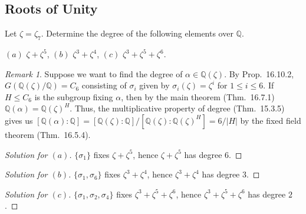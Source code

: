 \documentclass[12pt]{article}
\theoremstyle{remark}
\newtheorem*{remark}{Remark}
\begin{document}
\subsection{Roots of Unity}
\setcounter{subsubsection}{2}
\begin{problem}
  Let $\zeta = \zeta_7$. Determine the degree of the following elements over $\mathbb{Q}$.
  \par \noindent $(a)$ $\zeta + \zeta^5$, $(b)$ $\zeta^3 + \zeta^4$, $(c)$ $\zeta^3 + \zeta^5 + \zeta^6$.
\end{problem}
\begin{remark}
  Suppose we want to find the degree of $\alpha \in \mathbb{Q}(\zeta)$. By Prop.~16.10.2, $G(\mathbb{Q}(\zeta)/\mathbb{Q}) = C_6$ consisting of $\sigma_i$ given by $\sigma_i(\zeta) = \zeta^i$ for $1 \le i \le 6$. If $H \leqslant C_6$ is the subgroup fixing $\alpha$, then by the main theorem (Thm.~16.7.1)  $\mathbb{Q}(\alpha) = \mathbb{Q}(\zeta)^H$. Thus, the multiplicative property of degree (Thm.~15.3.5) gives us $[\mathbb{Q}(\alpha) : \mathbb{Q}] = [\mathbb{Q}(\zeta) : \mathbb{Q}] / [\mathbb{Q}(\zeta) : \mathbb{Q}(\zeta)^H] = 6/\lvert H \rvert$ by the fixed field theorem (Thm.~16.5.4).
\end{remark}
\begin{proof}[Solution for $(a)$]
  $\{\sigma_1\}$ fixes $\zeta + \zeta^5$, hence $\zeta + \zeta^5$ has degree $6$.
\end{proof}
\begin{proof}[Solution for $(b)$]
  $\{\sigma_1,\sigma_6\}$ fixes $\zeta^3 + \zeta^4$, hence $\zeta^3 + \zeta^4$ has degree $3$.
\end{proof}
\begin{proof}[Solution for $(c)$]
  $\{\sigma_1,\sigma_2,\sigma_4\}$ fixes $\zeta^3 + \zeta^5 + \zeta^6$, hence $\zeta^3 + \zeta^5 + \zeta^6$ has degree $2$.
\end{proof}
\end{document}
